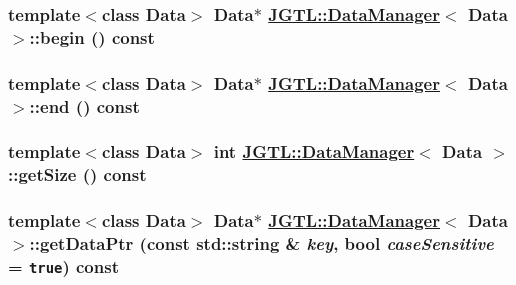 \hypertarget{class_j_g_t_l_1_1_data_manager_23842ccd54e7f6e33035635181a533fd}{
\subsubsection[begin]{\setlength{\rightskip}{0pt plus 5cm}template$<$class Data$>$ Data$\ast$ \hyperlink{class_j_g_t_l_1_1_data_manager}{JGTL::Data\-Manager}$<$ Data $>$::begin () const}}
\label{class_j_g_t_l_1_1_data_manager_23842ccd54e7f6e33035635181a533fd}


\hypertarget{class_j_g_t_l_1_1_data_manager_58cae71a92dc49f2cf7b051b1153afd3}{
\subsubsection[end]{\setlength{\rightskip}{0pt plus 5cm}template$<$class Data$>$ Data$\ast$ \hyperlink{class_j_g_t_l_1_1_data_manager}{JGTL::Data\-Manager}$<$ Data $>$::end () const}}
\label{class_j_g_t_l_1_1_data_manager_58cae71a92dc49f2cf7b051b1153afd3}


\hypertarget{class_j_g_t_l_1_1_data_manager_f4f37d5da6b7a6b1bd27378249fbf778}{
\subsubsection[getSize]{\setlength{\rightskip}{0pt plus 5cm}template$<$class Data$>$ int \hyperlink{class_j_g_t_l_1_1_data_manager}{JGTL::Data\-Manager}$<$ Data $>$::get\-Size () const}}
\label{class_j_g_t_l_1_1_data_manager_f4f37d5da6b7a6b1bd27378249fbf778}


\hypertarget{class_j_g_t_l_1_1_data_manager_6551f27a6d72f21451ea061ac975f017}{
\subsubsection[getDataPtr]{\setlength{\rightskip}{0pt plus 5cm}template$<$class Data$>$ Data$\ast$ \hyperlink{class_j_g_t_l_1_1_data_manager}{JGTL::Data\-Manager}$<$ Data $>$::get\-Data\-Ptr (const std::string \& {\em key}, bool {\em case\-Sensitive} = {\tt true}) const}}
\label{class_j_g_t_l_1_1_data_manager_6551f27a6d72f21451ea061ac975f017}


